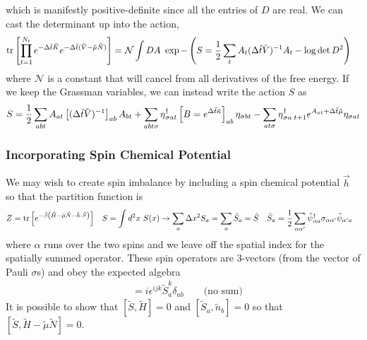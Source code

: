 which is manifestly positive-definite since all the entries of $D$ are real.
We can cast the determinant up into the action,
\begin{align}
	\text{tr}\left[ \prod_{t=1}^{N_t} e^{-\Delta \tilde{t}\tilde{K}}  e^{-\Delta \tilde{t} (\tilde{V} - \tilde{\mu}\tilde{N})}  \right]
	=&
	~\mathcal{N}
	\int DA ~ \exp -\left(S = \frac{1}{2} \sum_t A_t (\Delta\tilde{t}\tilde{V})^{-1} A_t - \log \det D^2 \right)
\end{align}
where $\mathcal{N}$ is a constant that will cancel from all derivatives of the free energy.
If we keep the Grassman variables, we can instead write the action $S$ as
\begin{align}
	S = 
	\frac{1}{2} \sum_{ab t} A_{at} \left[(\Delta\tilde{t} \tilde{V})^{-1}\right]_{ab} A_{bt}
+	\sum_{ab t \sigma} \eta{}^{\dagger}_{\sigma a t} \left[ B = e^{\Delta\tilde{t}\tilde{\kappa}}\right]_{ab} \eta_{\sigma b t}
-	\sum_{a t \sigma}\eta{}^{\dagger}_{\sigma a\; t+1} e^{A_{at} + \Delta \tilde{t} \tilde{\mu}} \eta_{\sigma a t}
\end{align}

\subsubsection{Incorporating Spin Chemical Potential}

We may wish to create spin imbalance by including a spin chemical potential $\vec{h}$ so that the partition function is
\begin{align}
	Z &= \text{tr}\left[e^{-\tilde{\beta}\left(\tilde{H} - \tilde{\mu}\tilde{N} - \tilde{h}\cdot\tilde{S}\right)} \right]
	&
	S &= \int d^2x~ S(x) \rightarrow \sum_a \Delta x^2 S_a = \sum_a \tilde{S}_a = \tilde{S}
	&
	\tilde{S}_a &= \frac{1}{2} \sum_{\alpha \alpha'} \tilde{\psi}{}^{\dagger}_{\alpha a} \sigma_{\alpha \alpha'} \tilde{\psi}_{\alpha' a}
\end{align}
where $\alpha$ runs over the two spins and we leave off the spatial index for the spatially summed operator.
These spin operators are 3-vectors (from the vector of Pauli $\sigma$s) and obey the expected algebra
\begin{align}
	[\tilde{S}_a^i, \tilde{S}_b^j] &= i \epsilon^{ijk} \tilde{S}^k_a \delta_{ab} \qquad\text{(no sum)}
\end{align}
It is possible to show that $[\tilde{S}, \tilde{H}] = 0$ and $[\tilde{S}_a, \tilde{n}_b] = 0$ so that $[\tilde{S}, \tilde{H} - \tilde{\mu}\tilde{N}] = 0$.

